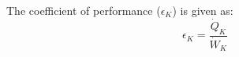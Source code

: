 The coefficient of performance (\(\epsilon_K\)) is given as:  
\[
\epsilon_K = \frac{\dot{Q}_K}{\dot{W}_K}
\]